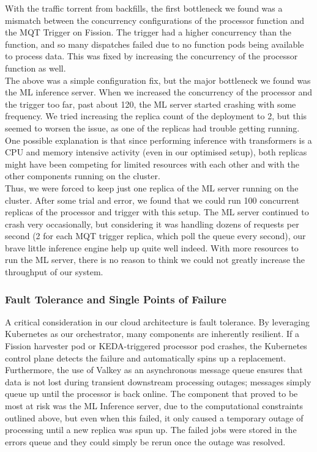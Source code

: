 With the traffic torrent from backfills, the first bottleneck we found was a mismatch between the concurrency configurations of the processor function and the MQT Trigger on Fission. The trigger had a higher concurrency than the function, and so many dispatches failed due to no function pods being available to process data. This was fixed by increasing the concurrency of the processor function as well.
\\

The above was a simple configuration fix, but the major bottleneck we found was the ML inference server. When we increased the concurrency of the processor and the trigger too far, past about 120, the ML server started crashing with some frequency. We tried increasing the replica count of the deployment to 2, but this seemed to worsen the issue, as one of the replicas had trouble getting running. One possible explanation is that since performing inference with transformers is a CPU and memory intensive activity (even in our optimised setup), both replicas might have been competing for limited resources with each other and with the other components running on the cluster.
\\

Thus, we were forced to keep just one replica of the ML server running on the cluster. After some trial and error, we found that we could run 100 concurrent replicas of the processor and trigger with this setup. The ML server continued to crash very occasionally, but considering it was handling dozens of requests per second (2 for each MQT trigger replica, which poll the queue every second), our brave little inference engine help up quite well indeed. With more resources to run the ML server, there is no reason to think we could not greatly increase the throughput of our system.

\subsubsection{Fault Tolerance and Single Points of Failure}
A critical consideration in our cloud architecture is fault tolerance. By leveraging Kubernetes as our orchestrator, many components are inherently resilient. If a Fission harvester pod or KEDA-triggered processor pod crashes, the Kubernetes control plane detects the failure and automatically spins up a replacement. Furthermore, the use of Valkey as an asynchronous message queue ensures that data is not lost during transient downstream processing outages; messages simply queue up until the processor is back online. The component that proved to be most at risk was the ML Inference server, due to the computational constraints outlined above, but even when this failed, it only caused a temporary outage of processing until a new replica was spun up. The failed jobs were stored in the errors queue and they could simply be rerun once the outage was resolved.

